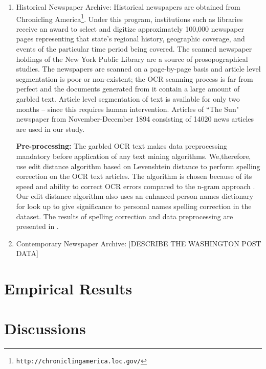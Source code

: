 \documentclass[a4paper,man,natbib]{apa6}
\begin{document}
\begin{enumerate}
\item Historical Newspaper Archive: Historical newspapers are obtained from Chronicling America\footnote{\texttt{http://chroniclingamerica.loc.gov/}}. Under this program, institutions such as libraries receive an award to select and digitize approximately 100,000 newspaper pages representing that state's regional history, geographic coverage, and events of the particular time period being covered. The scanned newspaper holdings of the New York Public Library are a source of prosopographical studies. The newspapers are scanned on a page-by-page basis and article level
segmentation is poor or non-existent; the OCR scanning process is far
from perfect and the documents generated from it contain a large
amount of garbled text. Article level segmentation of text is available for only two months -- since this requires human intervention. Articles of ``The Sun" newspaper from November-December 1894 consisting of 14020 news articles are used in our study. 

\textbf{Pre-processing: } The garbled OCR text makes data preprocessing mandatory before application of any text mining algorithms. We,therefore, use edit distance algorithm based on Levenshtein distance to perform spelling correction on the OCR text articles. The algorithm is chosen because of its speed and ability to correct OCR errors compared to the n-gram approach \cite{chattopadhyaya2013fast}. Our edit distance algorithm also uses an enhanced person names dictionary for look up to give significance to personal names spelling correction in the dataset. The results of spelling correction and data preprocessing are presented in \cite{Gupta_14a}.


\item Contemporary Newspaper Archive: [DESCRIBE THE WASHINGTON POST DATA]
\end{enumerate}




\section{Empirical Results}

\section{Discussions}
\end{document}
